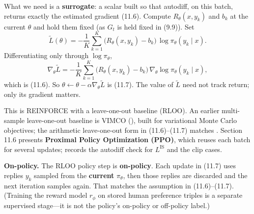 What we need is a \textbf{surrogate}: a scalar built so that autodiff, on this batch, returns exactly the estimated gradient (11.6). Compute $R_\theta(x,y_k)$ and $b_k$ at the current $\theta$ and hold them fixed (as $G_t$ is held fixed in (9.9)). Set \[
\widetilde{L}(\theta)
=
-\frac{1}{K}\sum_{k=1}^{K}
\bigl(R_\theta(x,y_k)-b_k\bigr)\,\log\pi_\theta(y_k\mid x).
\] Differentiating only through $\log\pi_\theta$, \[
\nabla_\theta\widetilde{L}
=
-\frac{1}{K}\sum_{k=1}^{K}
\bigl(R_\theta(x,y_k)-b_k\bigr)\,
\nabla_\theta\log\pi_\theta(y_k\mid x),
\] which is (11.6). So $\theta\leftarrow\theta-\alpha\nabla_\theta\widetilde{L}$ is (11.7). The value of $\widetilde{L}$ need not track return; only its gradient matters.

This is REINFORCE with a leave-one-out baseline (RLOO). An earlier multi-sample leave-one-out baseline is VIMCO (), built for variational Monte Carlo objectives; the arithmetic leave-one-out form in (11.6)--(11.7) matches . Section 11.6 presents \textbf{Proximal Policy Optimization (PPO)}, which reuses each batch for several updates;  records the autodiff check for $L^{\mathrm{IS}}$ and the clip cases.

\textbf{On-policy.} The RLOO policy step is \textbf{on-policy}. Each update in (11.7) uses replies $y_k$ sampled from the \textbf{current} $\pi_\theta$, then those replies are discarded and the next iteration samples again. That matches the assumption in (11.6)--(11.7). (Training the reward model $r_\phi$ on stored human preference triples is a separate supervised stage---it is not the policy's on-policy or off-policy label.)

